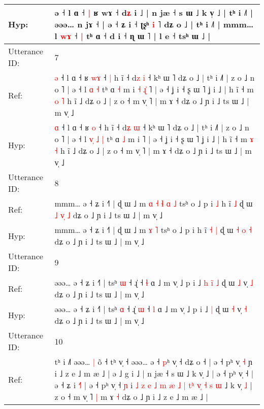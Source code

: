 \documentclass[10pt]{article}
\DeclareRobustCommand{\hl}[1]{{\textcolor{red}{#1}}}
\begin{document}
\begin{longtable}{ll}
Hyp: & ə ˧ l ɑ ˧\hl{ }\hl{|} ʁ wɤ ˧ d\hl{ʑ} i ˩ | n jæ ˧ s ɯ ˩ k v̩ ˩ | tʰ i ˩˥ | əəə… n jɤ ˧ | ə ˧ ʑ i ˧ ʈʂʰ \hl{i} ˥ dʑ o ˩ | tʰ i ˩˥ | mmm… l \hl{w}\hl{ɤ} ˧\hl{ }\hl{|} tʰ ɑ ˧ d i ˧ ɳ ɯ ˥ | l e ˧ tsʰ ɯ ˩ |
 \\
\midrule
Utterance ID: & 7 \\
Ref: & \hl{ə} ˧ l ɑ ˧ ʁ \hl{w}\hl{ɤ} ˧\hl{ }\hl{|} h ĩ ˧ d\hl{z} \hl{i} ˧ kʰ ɯ ˥ dʑ o ˩ | tʰ i ˩˥ | z o ˩ n o ˥ | ə ˧ l\hl{}\hl{}\hl{} \hl{ɑ} \hl{˧} tʰ ɑ \hl{˧} m i\hl{ }\hl{˧}\hl{ }\hl{ɻ}\hl{̍} ˥ | ə ˧ ʝ i ˧ ʂ ɯ ˥ ʝ i ˩ | h ĩ ˧ m \hl{o} \hl{˥} h ĩ ˩ dʑ o ˩ | z o ˧ m v̩ ˥ | m ɤ ˧ dʑ o ˩ ɲ i ˩ ts ɯ ˩ | m v̩ ˩
 \\
Hyp: & \hl{ɑ} ˧ l ɑ ˧ ʁ \hl{}\hl{o} ˧\hl{}\hl{} h ĩ ˧ d\hl{ʑ} \hl{ɯ} ˧ kʰ ɯ ˥ dʑ o ˩ | tʰ i ˩˥ | z o ˩ n o ˥ | ə ˧ l\hl{ }\hl{v}\hl{̩} \hl{˩} \hl{|} tʰ ɑ \hl{˩} m i\hl{}\hl{}\hl{}\hl{}\hl{} ˥ | ə ˧ ʝ i ˧ ʂ ɯ ˥ ʝ i ˩ | h ĩ ˧ m \hl{ɤ} \hl{˧} h ĩ ˩ dʑ o ˩ | z o ˧ m v̩ ˥ | m ɤ ˧ dʑ o ˩ ɲ i ˩ ts ɯ ˩ | m v̩ ˩
 \\
\midrule
Utterance ID: & 8 \\
Ref: & mmm… ə ˧ ʑ i ˧˥ | ɖ ɯ ˩ m\hl{ }\hl{ɑ}\hl{ }\hl{˧}\hl{ }\hl{ɬ} \hl{ɑ} \hl{˩} tsʰ o ˩ p i\hl{ }\hl{˩} h ĩ\hl{}\hl{} \hl{˩} ɖ ɯ \hl{˩} \hl{v}\hl{̩} \hl{˩} dʑ o ˩ ɲ i ˩ ts ɯ ˩ | m v̩ ˩
 \\
Hyp: & mmm… ə ˧ ʑ i ˧˥ | ɖ ɯ ˩ m\hl{}\hl{}\hl{}\hl{}\hl{}\hl{} \hl{ɤ} \hl{˥} tsʰ o ˩ p i\hl{}\hl{} h ĩ\hl{ }\hl{˧} \hl{|} ɖ ɯ \hl{˧} \hl{}\hl{o} \hl{˧} dʑ o ˩ ɲ i ˩ ts ɯ ˩ | m v̩ ˩
 \\
\midrule
Utterance ID: & 9 \\
Ref: & əəə… ə ˧ ʑ i ˧˥ | tsʰ \hl{ɯ} ˧ ɻ̍\hl{}\hl{} ˧ \hl{ɬ} ɑ ˩ m v̩ ˩ p i ˩\hl{ }\hl{h}\hl{ }\hl{i}\hl{̃} \hl{˩} ɖ ɯ \hl{˩} v̩ \hl{˩} dʑ o ˩ ɲ i ˩ ts ɯ ˩ | m v̩ ˩
 \\
Hyp: & əəə… ə ˧ ʑ i ˧˥ | tsʰ \hl{ɑ} ˧ ɻ̍\hl{ }\hl{ɯ} ˧ \hl{l} ɑ ˩ m v̩ ˩ p i ˩\hl{}\hl{}\hl{}\hl{}\hl{} \hl{|} ɖ ɯ \hl{˧} v̩ \hl{˧} dʑ o ˩ ɲ i ˩ ts ɯ ˩ | m v̩ ˩
 \\
\midrule
Utterance ID: & 10 \\
Ref: & tʰ i ˩˥\hl{}\hl{} əəə…\hl{ }\hl{|} o\hl{̃} ˧ tʰ v̩ ˧\hl{}\hl{} əəə… ə ˧ \hl{p}ʰ v̩ ˧ dʑ o ˧ | ə ˧ pʰ v̩ \hl{˧} ɲ i ˩ z e ˩ m æ ˩ | ə ˩ g i ˩ | n jæ ˧ s ɯ ˩ k v̩ ˩ | ə ˧ pʰ v̩ ˧ | ə ˧ ʑ i \hl{˧}˥ | ə ˧ pʰ v̩ ˧ \hl{ɲ} i\hl{ }\hl{˩}\hl{ }\hl{z}\hl{ }\hl{e}\hl{ }\hl{˩}\hl{ }\hl{m}\hl{ }\hl{æ}\hl{ }\hl{˩}\hl{ }\hl{|}\hl{ }\hl{t}\hl{ʰ}\hl{ }\hl{v}\hl{̩}\hl{ }\hl{˧} \hl{s}\hl{ }\hl{ɯ} ˩ k v̩ \hl{˩} | z o ˧ m v̩ ˥\hl{ }\hl{|} m ɤ \hl{˧} dʑ o ˩ ɲ i ˩ z e ˩ m æ ˩ |
 \\

\end{longtable}
\end{document}
